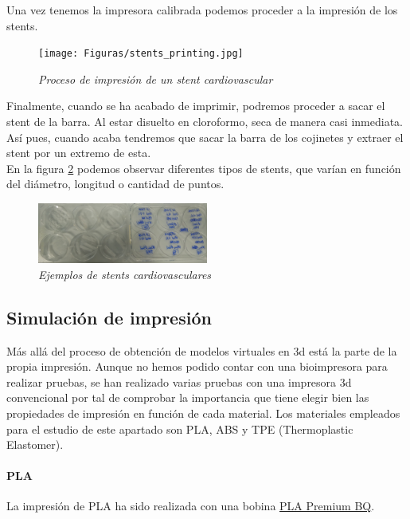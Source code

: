 \documentclass[a4paper,12pt]{article}
\begin{document}
Una vez tenemos la impresora calibrada podemos proceder a la impresión de los stents.
	
	\begin{figure}[!ht]
	\begin{center}
	  \texttt{[image: Figuras/stents\_printing.jpg]}
	  \caption{\emph{Proceso de impresión de un stent cardiovascular}}
	\end{center}
	\label{stents_printing}
	\end{figure}

Finalmente, cuando se ha acabado de imprimir, podremos proceder a sacar el stent de la barra. Al estar disuelto en cloroformo, seca de manera casi inmediata. Así pues, cuando acaba tendremos que sacar la barra de los cojinetes y extraer el stent por un extremo de esta.\\

En la figura \ref{stents_all} podemos observar diferentes tipos de stents, que varían en función del diámetro, longitud o cantidad de puntos.

	\begin{figure}[!ht]
	\begin{center}
	  \includegraphics[width=0.5\textwidth]{Figuras/stents_all.jpg}
	  \caption{\emph{Ejemplos de stents cardiovasculares}}
	\end{center}
	\label{stents_all}
	\end{figure}

\subsection{Simulación de impresión}
Más allá del proceso de obtención de modelos virtuales en 3d está la parte de la propia impresión. Aunque no hemos podido contar con una bioimpresora para realizar pruebas, se han realizado varias pruebas con una impresora 3d convencional por tal de comprobar la importancia que tiene elegir bien las propiedades de impresión en función de cada material. Los materiales empleados para el estudio de este apartado son PLA, ABS y TPE (Thermoplastic Elastomer).\\

\paragraph{PLA}
La impresión de PLA ha sido realizada con una bobina \href{https://store.bq.com/es/bobina-pla-bq/}{PLA Premium BQ}.\\
\end{document}
